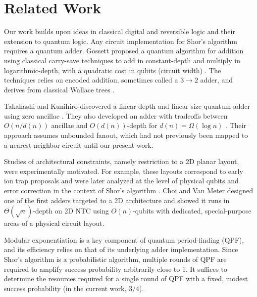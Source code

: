 \section{Related Work}
\label{sec:fpl-related}

Our work builds upon ideas in classical digital and reversible logic and their extension to quantum logic.
Any circuit implementation for Shor's algorithm requires a quantum adder.
Gossett proposed a quantum algorithm for addition using classical carry-save techniques to add
in constant-depth and multiply in logarithmic-depth, with a quadratic
cost in qubits (circuit width) \cite{Gossett1998}. The techniques relies on encoded addition, sometimes
called a $3 \rightarrow 2$ adder, and derives from classical Wallace trees \cite{Wallace1964}.

Takahashi and Kunihiro discovered a linear-depth
and linear-size quantum adder using zero ancillae \cite{Takahashi2005}.
They also developed an adder with tradeoffs between $O(n/d(n))$ ancillae and
$O(d(n))$-depth for $d(n) = \Omega(\log n)$ \cite{Takahashi2009}. 
Their approach assumes unbounded fanout, which had not previously been mapped to a
nearest-neighbor circuit until our present work.

Studies of architectural constraints, namely restriction to a 2D planar layout, 
were experimentally motivated. For example, these layouts correspond
to early ion trap proposals \cite{Kielpinski2002}
and were later analyzed at the level of physical qubits and error correction in the context of Shor's algorithm \cite{Kubi09}.
Choi and Van Meter designed one of the first adders targeted to a 2D architecture 
and showed it runs in $\Theta(\sqrt{n})$-depth on \textsf{2D NTC} \cite{Choi2010}
using $O(n)$-qubits with dedicated, special-purpose areas of a physical
circuit layout.

Modular exponentiation is a key component of quantum period-finding (QPF),
and its efficiency relies on that of its underlying adder implementation.
Since Shor's algorithm is a probabilistic algorithm, multiple rounds of
QPF are required to amplify success probability arbitrarily close to 1.
It suffices to determine the resources
required for a single round of QPF with a fixed, modest success probability
(in the current work, $3/4$).

